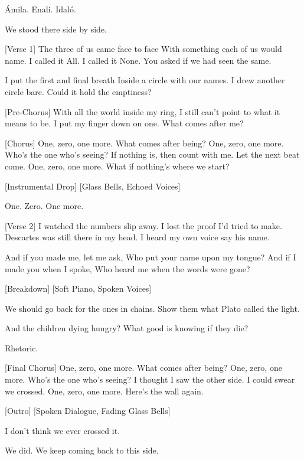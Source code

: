 \begin{lyrics}

Ámila.
Enali.
Idaló.

We stood there side by side.

[Verse 1]
The three of us came face to face
With something each of us would name.
I called it All. I called it None.
You asked if we had seen the same.

I put the first and final breath
Inside a circle with our names.
I drew another circle bare.
Could it hold the emptiness?

[Pre-Chorus]
With all the world inside my ring,
I still can’t point to what it means to be.
I put my finger down on one.
What comes after me?

[Chorus]
One, zero, one more.
What comes after being?
One, zero, one more.
Who’s the one who’s seeing?
If nothing is, then count with me.
Let the next beat come.
One, zero, one more.
What if nothing’s where we start?

[Instrumental Drop]
[Glass Bells, Echoed Voices]

One.
Zero.
One more.

[Verse 2]
I watched the numbers slip away.
I lost the proof I’d tried to make.
Descartes was still there in my head.
I heard my own voice say his name.

And if you made me, let me ask,
Who put your name upon my tongue?
And if I made you when I spoke,
Who heard me when the words were gone?

[Breakdown]
[Soft Piano, Spoken Voices]

We should go back for the ones in chains.
Show them what Plato called the light.

And the children dying hungry?
What good is knowing if they die?

Rhetoric.

[Final Chorus]
One, zero, one more.
What comes after being?
One, zero, one more.
Who’s the one who’s seeing?
I thought I saw the other side.
I could swear we crossed.
One, zero, one more.
Here’s the wall again.

[Outro]
[Spoken Dialogue, Fading Glass Bells]

I don’t think we ever crossed it.

We did.
We keep coming back to this side.
\end{lyrics}

